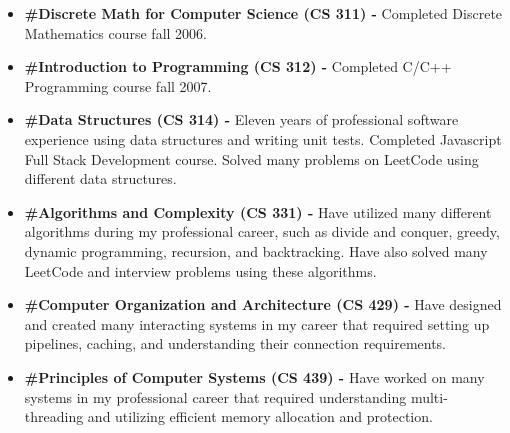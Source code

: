 \documentclass[10pt,a4paper]{resume}
\begin{document}

\clearpage


\begin{itemize}
\item \textbf{\color{accent}#Discrete Math for Computer Science (CS 311) -} Completed Discrete Mathematics course fall 2006.
\item \textbf{\color{accent}#Introduction to Programming (CS 312) -} Completed C/C++ Programming course fall 2007.
\item \textbf{\color{accent}#Data Structures (CS 314) -} Eleven years of professional software experience using data structures and writing unit tests. Completed Javascript Full Stack Development course. Solved many problems on LeetCode using different data structures.
\item \textbf{\color{accent}#Algorithms and Complexity (CS 331) -} Have utilized many different algorithms during my professional career, such as divide and conquer, greedy, dynamic programming, recursion, and backtracking. Have also solved many LeetCode and interview problems using these algorithms.
\item \textbf{\color{accent}#Computer Organization and Architecture (CS 429) -} Have designed and created many interacting systems in my career that required setting up pipelines, caching, and understanding their connection requirements.
\item \textbf{\color{accent}#Principles of Computer Systems (CS 439) -} Have worked on many systems in my professional career that required understanding multi-threading and utilizing efficient memory allocation and protection.
\end{itemize}
\end{document}
